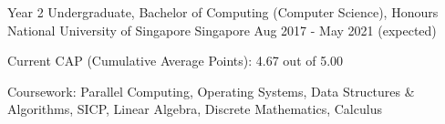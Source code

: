 

\begin{cventries}

  \cventry
    {Year 2 Undergraduate, Bachelor of Computing (Computer Science), Honours} %
    {National University of Singapore} %
    {Singapore} %
    {Aug 2017 - May 2021 (expected)} %
    {
      \begin{cvitems} %
        \item {Current CAP (Cumulative Average Points): 4.67 out of 5.00}
        \item {Coursework: Parallel Computing, Operating Systems, Data Structures \& Algorithms, SICP, Linear Algebra, Discrete Mathematics, Calculus}
      \end{cvitems}
    }
    
    


\end{cventries}
